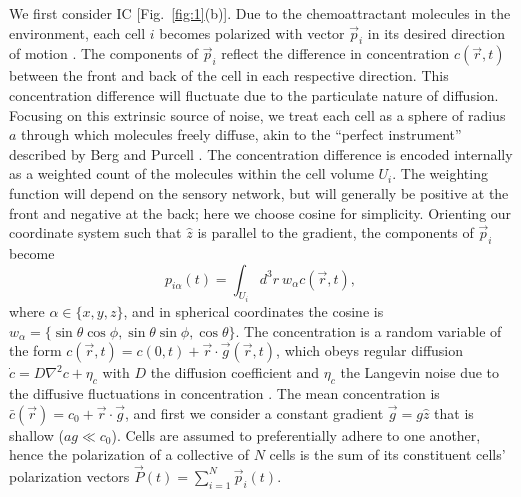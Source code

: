 We first consider IC [Fig.\ \ref{fig:1}(b)]. Due to the chemoattractant molecules in the environment, each cell $i$ becomes polarized with vector $\vec{p}_i$ in its desired direction of motion \cite{jilkine2011comparison}. The components of $\vec{p}_i$ reflect the difference in concentration $c(\vec{r},t)$ between the front and back of the cell in each respective direction. This concentration difference will fluctuate due to the particulate nature of diffusion. Focusing on this extrinsic source of noise, we treat each cell as a sphere of radius $a$ through which molecules freely diffuse, akin to the ``perfect instrument'' described by Berg and Purcell \cite{berg1977physics}.
The concentration difference is encoded internally as a weighted count of the molecules within the cell volume $U_i$. The weighting function will depend on the sensory network, but will generally be positive at the front and negative at the back; here we choose cosine for simplicity. Orienting our coordinate system such that $\hat{z}$ is parallel to the gradient, the components of $\vec{p}_i$ become
\begin{equation}
p_{i\alpha}(t) = \int_{U_i} d^3r \ w_\alpha c(\vec{r},t) , \label{eq:ICcell}
\end{equation}
where $\alpha\in\{x,y,z\}$, and in spherical coordinates the cosine is $w_\alpha = \{\sin\theta \cos\phi, \sin\theta \sin\phi, \cos\theta\}$.
The concentration is a random variable of the form
$c(\vec{r},t) = c(0,t) + \vec{r}\cdot\vec{g}(\vec{r},t)$,
which obeys regular diffusion $\dot{c} = D\nabla^2c+\eta_c$ with $D$ the diffusion coefficient and $\eta_c$ the Langevin noise due to the diffusive fluctuations in concentration \cite{gardiner1985handbook,fancher2016fundamental}. The mean concentration is
$\bar{c}(\vec{r}) = c_0 + \vec{r}\cdot\vec{g}$,
and first we consider a constant gradient
$\vec{g} = g \hat{z}$ that is shallow ($ag \ll c_0$). Cells are assumed to preferentially adhere to one another, hence the polarization of a collective of $N$ cells is the sum of its constituent cells' polarization vectors $\vec{P}(t) = \sum_{i=1}^N \vec{p}_i(t)$.

